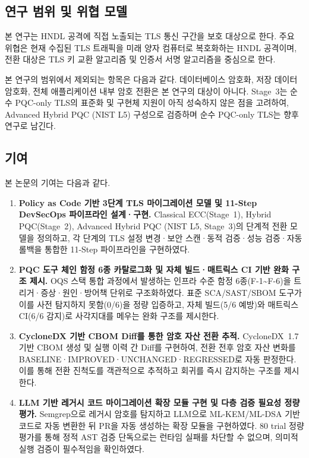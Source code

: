 \subsection{연구 범위 및 위협 모델}

본 연구는 HNDL 공격에 직접 노출되는 TLS 통신 구간을 보호 대상으로 한다.
주요 위협은 현재 수집된 TLS 트래픽을 미래 양자 컴퓨터로 복호화하는 HNDL 공격이며, 전환 대상은 TLS 키 교환 알고리즘 및 인증서 서명 알고리즘을 중심으로 한다.

본 연구의 범위에서 제외되는 항목은 다음과 같다.
데이터베이스 암호화, 저장 데이터 암호화, 전체 애플리케이션 내부 암호 전환은 본 연구의 대상이 아니다.
Stage~3는 순수 PQC-only TLS의 표준화 및 구현체 지원이 아직 성숙하지 않은 점을 고려하여, Advanced Hybrid PQC (NIST L5) 구성으로 검증하며 순수 PQC-only TLS는 향후 연구로 남긴다.

\subsection{기여}

본 논문의 기여는 다음과 같다.
\begin{enumerate}[itemsep=4pt]
  \item \textbf{Policy as Code 기반 3단계 TLS 마이그레이션 모델 및 11-Step DevSecOps 파이프라인 설계·구현.}
  Classical ECC(Stage~1), Hybrid PQC(Stage~2), Advanced Hybrid PQC (NIST L5, Stage~3)의 단계적 전환 모델을 정의하고, 각 단계의 TLS 설정 변경·보안 스캔·동적 검증·성능 검증·자동 롤백을 통합한 11-Step 파이프라인을 구현하였다.

  \item \textbf{PQC 도구 체인 함정 6종 카탈로그화 및 자체 빌드·매트릭스 CI 기반 완화 구조 제시.}
  OQS 스택 통합 과정에서 발생하는 인프라 수준 함정 6종(F-1\textasciitilde F-6)을 트리거·증상·원인·방어책 단위로 구조화하였다.
  표준 SCA/SAST/SBOM 도구가 이를 사전 탐지하지 못함(0/6)을 정량 입증하고, 자체 빌드(5/6 예방)와 매트릭스 CI(6/6 감지)로 사각지대를 메우는 완화 구조를 제시한다.

  \item \textbf{CycloneDX 기반 CBOM Diff를 통한 암호 자산 전환 추적.}
  CycloneDX~1.7 기반 CBOM 생성 및 실행 이력 간 Diff를 구현하여, 전환 전후 암호 자산 변화를 BASELINE·IMPROVED·UNCHANGED·REGRESSED로 자동 판정한다.
  이를 통해 전환 진척도를 객관적으로 추적하고 회귀를 즉시 감지하는 구조를 제시한다.

  \item \textbf{LLM 기반 레거시 코드 마이그레이션 확장 모듈 구현 및 다층 검증 필요성 정량 평가.}
  Semgrep으로 레거시 암호를 탐지하고 LLM으로 ML-KEM/ML-DSA 기반 코드로 자동 변환한 뒤 PR을 자동 생성하는 확장 모듈을 구현하였다.
  80 trial 정량 평가를 통해 정적 AST 검증 단독으로는 런타임 실패를 차단할 수 없으며, 의미적 실행 검증이 필수적임을 확인하였다.
\end{enumerate}